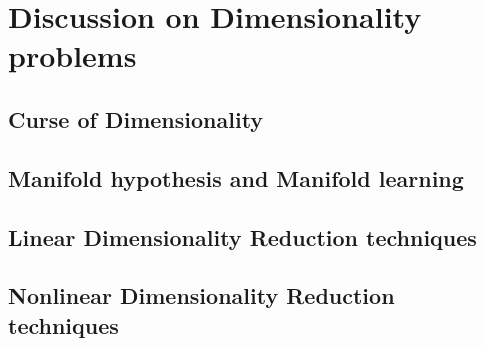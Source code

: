 \section{Discussion on Dimensionality problems}
\label{sec:dimensionality}

\subsection{Curse of Dimensionality}

\subsection{Manifold hypothesis and Manifold learning}

\subsection{Linear Dimensionality Reduction techniques}

\subsection{Nonlinear Dimensionality Reduction techniques}